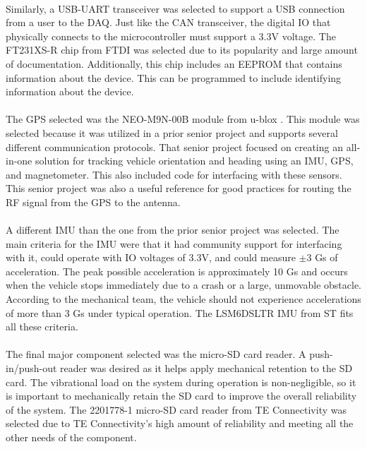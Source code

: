 \paragraph{}
Similarly, a USB-UART transceiver was selected to support a USB connection from a user to the DAQ.
Just like the CAN transceiver, the digital IO that physically connects to the microcontroller must support a 3.3V voltage.
The FT231XS-R chip from FTDI \cite{USBProductPage} was selected due to its popularity and large amount of documentation.
Additionally, this chip includes an EEPROM that contains information about the device.
This can be programmed to include identifying information about the device.

\paragraph{}
The GPS selected was the NEO-M9N-00B module from u-blox \cite{GPSProductPage}.
This module was selected because it was utilized in a prior senior project and supports several different communication protocols.
That senior project focused on creating an all-in-one solution for tracking vehicle orientation and heading using an IMU, GPS, and magnetometer.
This also included code for interfacing with these sensors.
This senior project was also a useful reference for good practices for routing the RF signal from the GPS to the antenna.

\paragraph{}
A different IMU than the one from the prior senior project was selected.
The main criteria for the IMU were that it had community support for interfacing with it, could operate with IO voltages of 3.3V, and could measure $\pm$3 Gs of acceleration.
The peak possible acceleration is approximately 10 Gs and occurs when the vehicle stops immediately due to a crash or a large, unmovable obstacle.
According to the mechanical team, the vehicle should not experience accelerations of more than 3 Gs under typical operation.
The LSM6DSLTR IMU from ST \cite{IMUProductPage} fits all these criteria.

\paragraph{}
The final major component selected was the micro-SD card reader.
A push-in/push-out reader was desired as it helps apply mechanical retention to the SD card.
The vibrational load on the system during operation is non-negligible, so it is important to mechanically retain the SD card to improve the overall reliability of the system.
The 2201778-1 micro-SD card reader from TE Connectivity \cite{SDReaderProductPage} was selected due to TE Connectivity's high amount of reliability and meeting all the other needs of the component.

